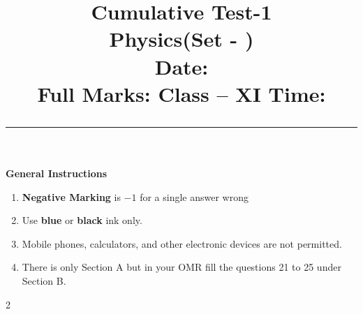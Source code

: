 \documentclass[addpoints,12pt,a4paper]{exam}
\title{%
  \vspace{-1.5cm}%
  {\huge\textbf{Cumulative Test-1}}\\[2mm]%
  {\LARGE Physics(Set - \customset)}\\[2mm]%
  {Date: {\datedate}}\\[3mm]%
  {\large \textbf{Full Marks: \numpoints} \hfill  Class -- XI \hfill \textbf{Time: \examduration}}%
  \vspace{3pt}%
  \hrule\vspace{-2em}%
}
\author{}
\date{}
\begin{document}
\maketitle

\vspace{0.2em}

\begin{center}
	\begin{tcolorbox}
		\begin{center}
			\textbf{\large{General Instructions}}
		\end{center}
		\begin{enumerate}
			\item \textbf{Negative Marking} is $-1$ for a single answer wrong
			\item Use \textbf{blue} or \textbf{black} ink only.
			\item Mobile phones, calculators, and other electronic devices are not permitted.
			\item There is only Section A but in your OMR fill the questions 21 to 25 under Section B.
		\end{enumerate}
		\vspace{0.2em}
	\end{tcolorbox}
\end{center}

\vspace{0.2em}
\begin{center}
\end{center}

\vspace{1pt}

\begin{multicols}{2}
\end{multicols}

\newpage
{}
\end{document}
